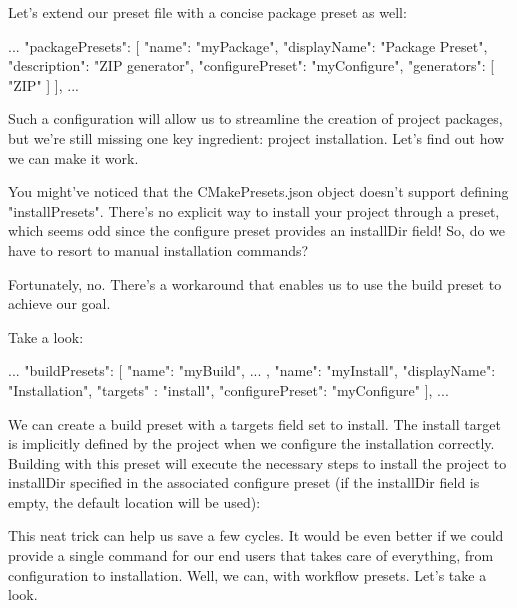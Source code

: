 Let’s extend our preset file with a concise package preset as well:


\begin{json}
...
    "packagePresets": [
        {
            "name": "myPackage",
            "displayName": "Package Preset",
            "description": "ZIP generator",
            "configurePreset": "myConfigure",
            "generators": [
            "ZIP"
            ]
        }
    ],
...
\end{json}

Such a configuration will allow us to streamline the creation of project packages, but we’re still missing one key ingredient: project installation. Let’s find out how we can make it work.


You might’ve noticed that the CMakePresets.json object doesn’t support defining "installPresets". There’s no explicit way to install your project through a preset, which seems odd since the configure preset provides an installDir field! So, do we have to resort to manual installation commands?

Fortunately, no. There’s a workaround that enables us to use the build preset to achieve our goal.

Take a look:


\begin{json}
...
    "buildPresets": [
        {
            "name": "myBuild",
            ...
        },
        {
            "name": "myInstall",
            "displayName": "Installation",
            "targets" : "install",
            "configurePreset": "myConfigure"
        }
    ],
...
\end{json}

We can create a build preset with a targets field set to install. The install target is implicitly defined by the project when we configure the installation correctly. Building with this preset will execute the necessary steps to install the project to installDir specified in the associated configure preset (if the installDir field is empty, the default location will be used):


This neat trick can help us save a few cycles. It would be even better if we could provide a single command for our end users that takes care of everything, from configuration to installation. Well, we can, with workflow presets. Let’s take a look.

